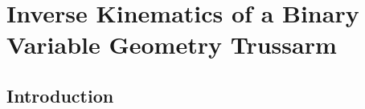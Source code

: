 \chapter{Inverse Kinematics of a Binary Variable Geometry Trussarm}
\label{chap:faq}
\section{Introduction}
